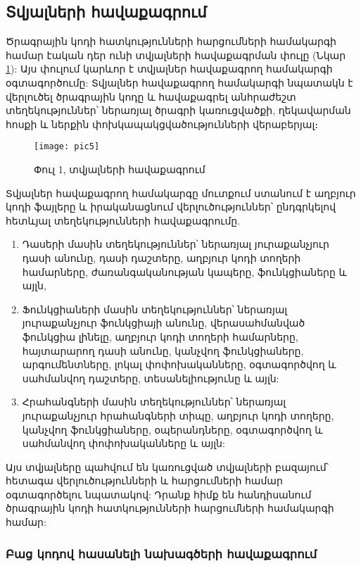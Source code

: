 {
    \subsection{Տվյալների հավաքագրում}\label{subsec:dataCollection}
    Ծրագրային կոդի հատկությունների հարցումների համակարգի համար էական դեր ունի տվյալների հավաքագրման փուլը
    (Նկար \ref{fig:figure5}): Այս փուլում  կարևոր է տվյալներ հավաքագրող համակարգի
    օգտագործումը: Տվյալներ հավաքագրող համակարգի նպատակն է վերլուծել ծրագրային կոդը և հավաքագրել անհրաժեշտ
    տեղեկություններ՝ ներառյալ ծրագրի կառուցվածքի, ղեկավարման հոսքի և ներքին փոխկապակցվածությունների վերաբերյալ։

    \begin{figure}[h]
        \centering
        \texttt{[image: pic5]}
        \caption{Փուլ 1, տվյալների հավաքագրում}
        \label{fig:figure5}
    \end{figure}

    Տվյալներ հավաքագրող համակարգը մուտքում ստանում է աղբյուր կոդի ֆայլերը և իրականացնում վերլուծություններ՝
    ընդգրկելով հետևյալ տեղեկությունների հավաքագրումը.
    \begin{enumerate}
        \item Դասերի մասին տեղեկություններ՝ ներառյալ յուրաքանչյուր դասի անունը, դասի դաշտերը,
        աղբյուր կոդի տողերի համարները, ժառանգականության կապերը, ֆունկցիաները և այլն,
        \item Ֆունկցիաների մասին տեղեկություններ՝ ներառյալ յուրաքանչյուր ֆունկցիայի անունը, վերասահմանված ֆունկցիա լինելը,
        աղբյուր կոդի տողերի համարները, հայտարարող դասի անունը, կանչվող ֆունկցիաները, արգումենտները, լոկալ փոփոխականները,
        օգտագործվող և սահմանվող դաշտերը, տեսանելիությունը և այլն:
        \item Հրահանգների մասին տեղեկություններ՝ ներառյալ յուրաքանչյուր հրահանգների տիպը, աղբյուր կոդի տողերը,
        կանչվող ֆունկցիաները, օպերանդները, օգտագործվող և սահմանվող փոփոխականները և այլն:
    \end{enumerate}

    Այս տվյալները պահվում են կառուցված տվյալների բազայում՝ հետագա վերլուծությունների և հարցումների համար
    օգտագործելու նպատակով: Դրանք հիմք են հանդիսանում ծրագրային կոդի հատկությունների հարցումների համակարգի համար:

    

    \subsubsection{Բաց կոդով հասանելի նախագծերի հավաքագրում}\label{subsubsec:sourceCodes}
    
}